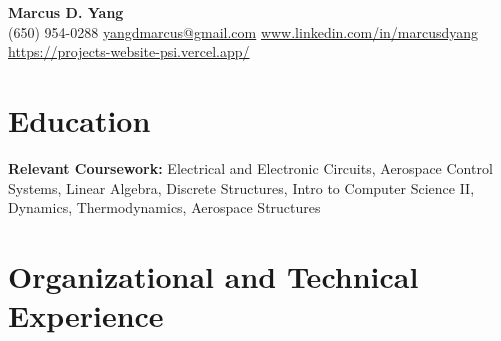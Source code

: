 \newcommand{\entrygap}{\vspace{2pt}}



\begin{center}
  {\fontsize{17}{20}\selectfont\bfseries Marcus D. Yang}\\[2pt]
  {\footnotesize (650) 954-0288 \textbar{} \href{mailto:yangdmarcus@gmail.com}{yangdmarcus@gmail.com} \textbar{} \href{https://www.linkedin.com/in/marcusdyang}{www.linkedin.com/in/marcusdyang} \textbar{} \href{https://projects-website-psi.vercel.app/}{https://projects-website-psi.vercel.app/}}
\end{center}

\section{Education}
\textbf{Relevant Coursework:} Electrical and Electronic Circuits, Aerospace Control Systems, Linear Algebra, Discrete Structures, Intro to Computer Science II, Dynamics, Thermodynamics, Aerospace Structures

\section{Organizational and Technical Experience}

